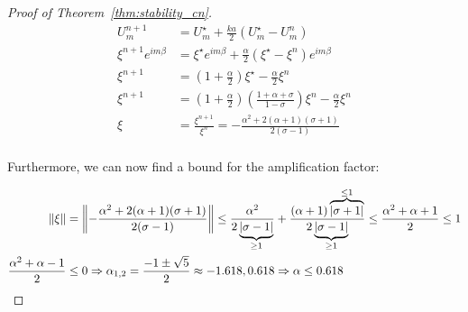 \begin{proof}[Proof of Theorem~\ref{thm:stability_cn}]
  \begin{align*}
    U_m^{n+1}               & =
    U_m^\star
    + \frac{ka}{2}(U_m^\star - U_m^n)                     \\
    \xi^{n+1} e^{i m \beta} & =
    \xi^\star e^{i m \beta}
    + \frac{\alpha}{2}(\xi^\star
    - \xi^n)e^{i m \beta}                                 \\
    \xi^{n+1}               & =
    (1 + \frac{\alpha}{2}) \xi^\star
    - \frac{\alpha}{2} \xi^n                              \\
    \xi^{n+1}               & =
    \left(1 + \frac{\alpha}{2}\right)
    \left(\frac{1 + \alpha + \sigma}{1 - \sigma}\right)\xi^n
    - \frac{\alpha}{2} \xi^n                              \\
    \xi                     & = \frac{\xi^{n+1}}{\xi^n} =
    -\frac{\alpha^2 + 2(\alpha + 1) (\sigma + 1)}
    {2 (\sigma - 1)} \tag{Source: Trust me bro}           \\
  \end{align*}

  Furthermore, we can now find a bound for the amplification factor:

  \begin{align*}
    \norm*{\xi} & = \norm*{
      -\frac{\alpha^2 + 2(\alpha + 1)(\sigma + 1)}
      {2(\sigma - 1)}}
    \leq
    \frac{
      \alpha^2}
    {
      2\underbrace{
        \abs{\sigma - 1}
      }_{
        \geq 1
      }
    }
    + \frac{
      (\alpha + 1)
      \overbrace{
        \abs{\sigma + 1}
      }^{
        \leq 1
      }
    }
    {2\underbrace{\abs{\sigma - 1}}_{\geq 1}}
    \leq
    \frac{
      \alpha^2
      + \alpha + 1
    }{2}
    \leq 1                  \\
    \frac{\alpha^2 + \alpha - 1}{2}
                & \leq 0
    \Rightarrow
    \alpha_{1,2}
    =
    \frac{-1 \pm \sqrt{5}}{2}
    \approx -1.618, 0.618
    \Rightarrow
    \alpha \leq 0.618
  \end{align*}

\end{proof}





